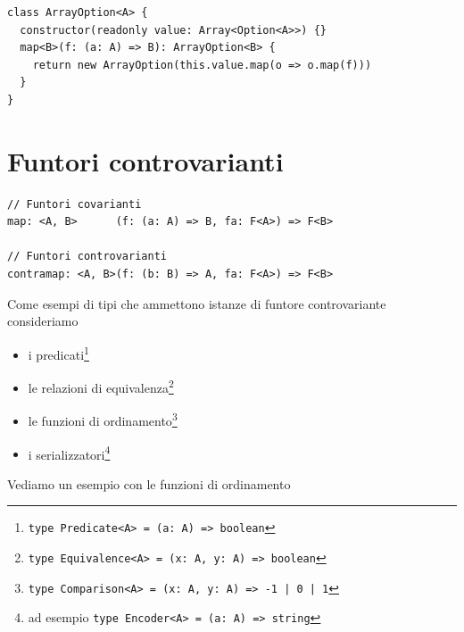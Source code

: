 \documentclass[12pt]{article}
\begin{document}
\begin{verbatim}
class ArrayOption<A> {
  constructor(readonly value: Array<Option<A>>) {}
  map<B>(f: (a: A) => B): ArrayOption<B> {
    return new ArrayOption(this.value.map(o => o.map(f)))
  }
}
\end{verbatim}

\newpage

\section{Funtori controvarianti}

\begin{verbatim}
// Funtori covarianti
map: <A, B>      (f: (a: A) => B, fa: F<A>) => F<B>

// Funtori controvarianti
contramap: <A, B>(f: (b: B) => A, fa: F<A>) => F<B>
\end{verbatim}

Come esempi di tipi che ammettono istanze di funtore controvariante consideriamo

\begin{itemize}
  \item i predicati\footnote{\texttt{type Predicate<A> = (a: A) => boolean}}
  \item le relazioni di equivalenza\footnote{\texttt{type Equivalence<A> = (x: A, y: A) => boolean}}
  \item le funzioni di ordinamento\footnote{\texttt{type Comparison<A> = (x: A, y: A) => -1 | 0 | 1}}
  \item i serializzatori\footnote{ad esempio \texttt{type Encoder<A> = (a: A) => string}}
\end{itemize}

Vediamo un esempio con le funzioni di ordinamento
\end{document}
